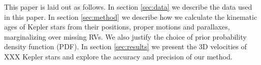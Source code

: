 
This paper is laid out as follows.
In section \ref{sec:data} we describe the data used in this paper.
In section \ref{sec:method} we describe how we calculate the kinematic ages of
Kepler stars from their positions, proper motions and parallaxes,
marginalizing over missing RVs.
We also justify the choice of prior probability density function (PDF).
In section \ref{sec:results} we present the 3D velocities of XXX Kepler stars
and explore the accuracy and precision of our method.

